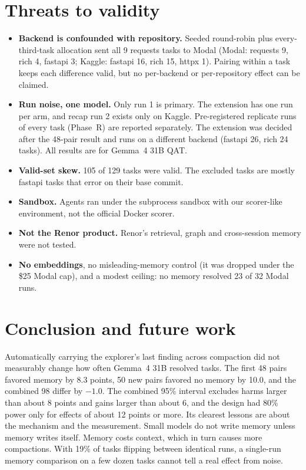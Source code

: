 \documentclass[11pt]{article}
\begin{document}
\section{Threats to validity}
\begin{itemize}
\item \textbf{Backend is confounded with repository.} Seeded round-robin plus every-third-task
  allocation sent all 9 requests tasks to Modal (Modal: requests 9, rich 4, fastapi 3; Kaggle:
  fastapi 16, rich 15, httpx 1). Pairing within a task keeps each difference valid, but no
  per-backend or per-repository effect can be claimed.
\item \textbf{Run noise, one model.} Only run 1 is primary. The extension has one run per arm, and
  recap run 2 exists only on Kaggle. Pre-registered replicate runs of every task (Phase~R) are reported separately. The extension was decided
  after the 48-pair result and runs on a different backend (fastapi 26, rich 24 tasks). All results
  are for Gemma~4 31B QAT.
\item \textbf{Valid-set skew.} 105 of 129 tasks were valid. The excluded tasks are mostly fastapi
  tasks that error on their base commit.
\item \textbf{Sandbox.} Agents ran under the subprocess sandbox with our scorer-like environment, not
  the official Docker scorer.
\item \textbf{Not the Renor product.} Renor's retrieval, graph and cross-session memory were not
  tested.
\item \textbf{No embeddings}, no misleading-memory control (it was dropped under the \$25 Modal
  cap), and a modest ceiling: no memory resolved 23 of 32 Modal runs.
\end{itemize}

\section{Conclusion and future work}
Automatically carrying the explorer's last finding across compaction did not measurably change how
often Gemma~4 31B resolved tasks. The first 48 pairs favored memory by 8.3 points, 50 new pairs
favored no memory by 10.0, and the combined 98 differ by $-1.0$. The combined 95\% interval excludes harms larger than about 8 points and gains larger than about 6, and the design had 80\% power only for effects of about 12 points or more.
Its clearest lessons are about the mechanism and the measurement. Small models do not write memory
unless memory writes itself. Memory costs context, which in turn causes more compactions. With
19\% of tasks flipping between identical runs, a single-run memory comparison on a few dozen tasks
cannot tell a real effect from noise.
\end{document}
